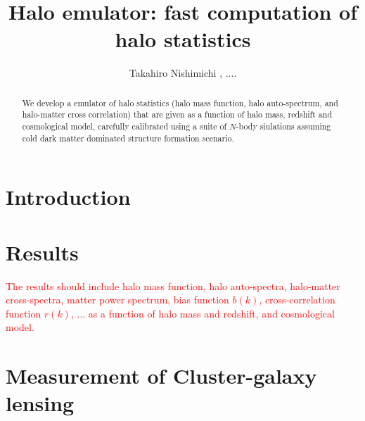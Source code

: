 \documentclass[iop, apjl, twocolappendix, numberedappendix]{emulateapj}
\newcommand{\mtrv}[1]{{\textcolor{red}{#1}}}
\begin{document}

\def\figdir{.}
\def\figext{pdf}



\title{Halo emulator: fast computation of halo statistics}
\author{
Takahiro Nishimichi , 
....
}





 \begin{abstract}
  We develop a emulator of halo statistics (halo mass function, halo
  auto-spectrum, and halo-matter cross correlation) that are given as a
  function of halo mass, redshift and cosmological model, carefully
  calibrated using a suite of $N$-body siulations assuming cold dark
  matter dominated structure formation scenario. 
 \end{abstract}

\keywords{}


\section{Introduction}
\label{sec:intro}

\section{Results}

\mtrv{The results should include halo mass function, halo auto-spectra,
 halo-matter cross-spectra, matter power spectrum, bias function $b(k)$,
 cross-correlation function $r(k)$, ... as a function of halo mass and
 redshift, and cosmological model.}


\section{Measurement of Cluster-galaxy lensing}


\end{document}

